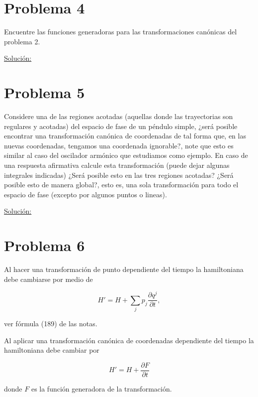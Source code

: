 \documentclass[a4paper,10pt]{article}
\numberwithin{equation}{section}
\begin{document}
\section{Problema 4}

Encuentre las funciones generadoras para las transformaciones canónicas del problema 
2.

\vspace{.3cm}

\underline{Solución:} \vspace{.3cm}

\section{Problema 5}

Considere una de las regiones acotadas (aquellas donde las trayectorias son regulares 
y acotadas) del espacio de fase de un péndulo simple, ¿será posible encontrar una 
transformación canónica de coordenadas de tal forma que, en las nuevas coordenadas, 
tengamos una coordenada ignorable?, note que esto es similar al caso del oscilador 
armónico que estudiamos como ejemplo. En caso de una respuesta afirmativa calcule 
esta transformación (puede dejar algunas integrales indicadas) ¿Será posible 
esto en las tres regiones acotadas? ¿Será posible esto de manera global?, esto es,
una sola transformación para todo el espacio de fase (excepto por algunos puntos o 
lineas).

\vspace{.3cm}

\underline{Solución:} \vspace{.3cm}

\section{Problema 6}

Al hacer una transformación de punto dependiente del tiempo la hamiltoniana 
debe cambiarse por medio de 

$$
H' = H + \sum_j p_j \frac{\partial q^j}{\partial t},
$$

ver fórmula (189) de las notas.

\vspace{.3cm}

Al aplicar una transformación canónica de coordenadas dependiente del tiempo la 
hamiltoniana debe cambiar por 

$$
H' = H + \frac{\partial F}{\partial t}
$$

donde $F$ es la función generadora de la transformación. 
\end{document}
